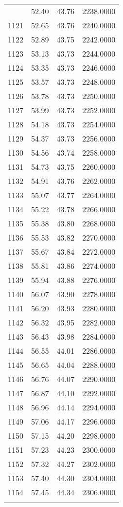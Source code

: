 \documentclass[
  captions=tableheading,
]{scrartcl}
\begin{document}
\begin{longtable} {l|l|l|l}
{1120 &	52.40 &	43.76 &	2238.0000\\
1121 &	52.65 &	43.76 &	2240.0000\\
1122 &	52.89 &	43.75 &	2242.0000\\
1123 &	53.13 &	43.73 &	2244.0000\\
1124 &	53.35 &	43.73 &	2246.0000\\
1125 &	53.57 &	43.73 &	2248.0000\\
1126 &	53.78 &	43.73 &	2250.0000\\
1127 &	53.99 &	43.73 &	2252.0000\\
1128 &	54.18 &	43.73 &	2254.0000\\
1129 &	54.37 &	43.73 &	2256.0000\\
1130 &	54.56 &	43.74 &	2258.0000\\
1131 &	54.73 &	43.75 &	2260.0000\\
1132 &	54.91 &	43.76 &	2262.0000\\
1133 &	55.07 &	43.77 &	2264.0000\\
1134 &	55.22 &	43.78 &	2266.0000\\
1135 &	55.38 &	43.80 &	2268.0000\\
1136 &	55.53 &	43.82 &	2270.0000\\
1137 &	55.67 &	43.84 &	2272.0000\\
1138 &	55.81 &	43.86 &	2274.0000\\
1139 &	55.94 &	43.88 &	2276.0000\\
1140 &	56.07 &	43.90 &	2278.0000\\
1141 &	56.20 &	43.93 &	2280.0000\\
1142 &	56.32 &	43.95 &	2282.0000\\
1143 &	56.43 &	43.98 &	2284.0000\\
1144 &	56.55 &	44.01 &	2286.0000\\
1145 &	56.65 &	44.04 &	2288.0000\\
1146 &	56.76 &	44.07 &	2290.0000\\
1147 &	56.87 &	44.10 &	2292.0000\\
1148 &	56.96 &	44.14 &	2294.0000\\
1149 &	57.06 &	44.17 &	2296.0000\\
1150 &	57.15 &	44.20 &	2298.0000\\
1151 &	57.23 &	44.23 &	2300.0000\\
1152 &	57.32 &	44.27 &	2302.0000\\
1153 &	57.40 &	44.30 &	2304.0000\\
1154 &	57.45 &	44.34 &	2306.0000\\
}
\end{longtable}
\end{document}
